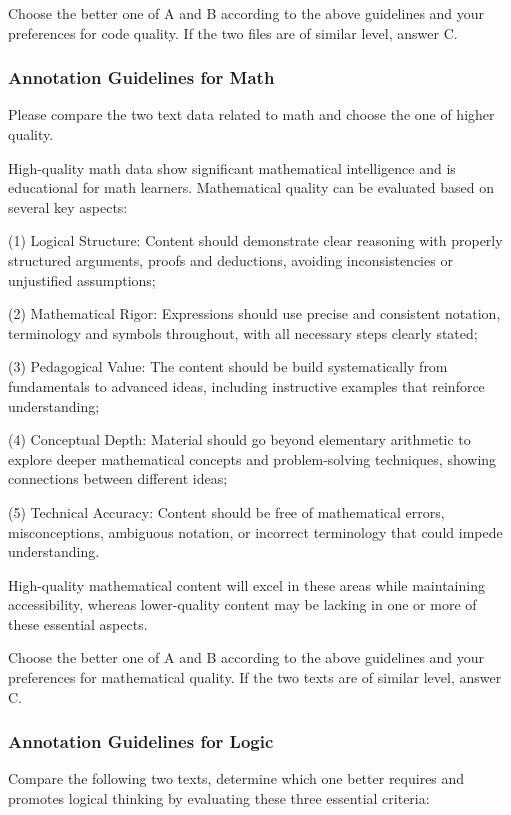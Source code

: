 Choose the better one of A and B according to the above guidelines and your preferences
for code quality. If the two files are of similar level, answer C.

\subsubsection{Annotation Guidelines for Math}

Please compare the two text data related to math and choose the one of higher
quality.

High-quality math data show significant mathematical intelligence and is
educational for math learners. Mathematical quality can be evaluated based on several
key aspects:

(1) Logical Structure: Content should demonstrate clear reasoning with properly
structured arguments, proofs and deductions, avoiding inconsistencies or
unjustified assumptions;

(2) Mathematical Rigor: Expressions should use precise and consistent notation,
terminology and symbols throughout, with all necessary steps clearly stated;

(3) Pedagogical Value: The content should be build systematically from
fundamentals to advanced ideas, including instructive examples that reinforce understanding;

(4) Conceptual Depth: Material should go beyond elementary arithmetic to explore
deeper mathematical concepts and problem-solving techniques, showing connections
between different ideas;

(5) Technical Accuracy: Content should be free of mathematical errors, misconceptions,
ambiguous notation, or incorrect terminology that could impede understanding.

High-quality mathematical content will excel in these areas while maintaining accessibility,
whereas lower-quality content may be lacking in one or more of these essential
aspects.

Choose the better one of A and B according to the above guidelines and your
preferences for mathematical quality. If the two texts are of similar level,
answer C.

\subsubsection{Annotation Guidelines for Logic}

Compare the following two texts, determine which one better requires and
promotes logical thinking by evaluating these three essential criteria:

